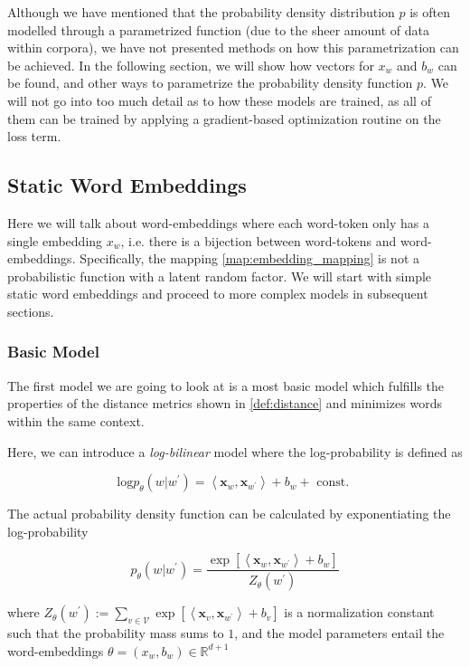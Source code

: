 \documentclass[a4paper,12pt,twoside,openright]{report}
\begin{document}
Although we have mentioned that the probability density distribution $p$ is often modelled through a parametrized function (due to the sheer amount of data within corpora), we have not presented methods on how this parametrization can be achieved.
In the following section, we will show how vectors for $x_w$ and $b_w$ can be found, and other ways to parametrize the probability density function $p$.
We will not go into too much detail as to how these models are trained, as all of them can be trained by applying a gradient-based optimization routine on the loss term.

\subsection{Static Word Embeddings}

Here we will talk about word-embeddings where each word-token only has a single embedding $x_w$, i.e. there is a bijection between word-tokens and word-embeddings. 
Specifically, the mapping \eqref{map:embedding_mapping} is not a probabilistic function with a latent random factor.
We will start with simple static word embeddings and proceed to more complex models in subsequent sections.

\subsubsection{Basic Model}

The first model we are going to look at is a most basic model which fulfills the properties of the distance metrics shown in \eqref{def:distance} and minimizes words within the same context.

Here, we can introduce a \textit{log-bilinear} \cite{cil_slides} model where the log-probability is defined as

\begin{equation}
\text{log} p_{\theta}(w | w^{\prime}) = \left\langle\mathbf{x}_{w}, \mathbf{x}_{w^{\prime}}\right\rangle+b_{w} + \text { const. }
\end{equation}

The actual probability density function can be calculated by exponentiating the log-probability

$$
p_{\theta}\left(w | w^{\prime}\right)=\frac{\exp \left[\left\langle\mathbf{x}_{w}, \mathbf{x}_{w^{\prime}}\right\rangle+b_{w}\right]}{Z_{\theta}\left(w^{\prime}\right)}
$$

where $Z_{\theta}\left(w^{\prime}\right):=\sum_{v \in \mathcal{V}} \exp \left[\left\langle\mathbf{x}_{v}, \mathbf{x}_{w^{\prime}}\right\rangle+b_{v}\right]$ is a normalization constant such that the probability mass sums to $1$, and the model parameters entail the word-embeddings $\theta = (x_w, b_w) \in \mathbb{R}^{d+1}$
\end{document}

